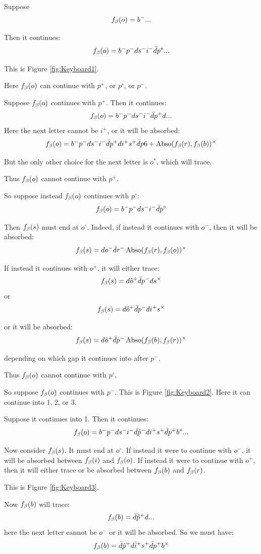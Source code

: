 \label{Keyboard}
Suppose
\[
f_\beta(o) = b^-...
\]

Then it continues:
\[
f_\beta(o) = b^- p^- d s^- i^- \bar{d} p^*...
\]

This is Figure \ref{fig:Keyboard1}.

Here $f_\beta(o)$ can continue with $p^+$, or $p^\circ$, or $p^-$.

Suppose $f_\beta(o)$ continues with $p^+$. Then it continues:
\[
f_\beta(o) = b^- p^- d s^- i^- \bar{d} p^+ d...
\]
Here the next letter cannot be $i^+$, or it will be absorbed:
\[
f_\beta(o) = b^- p^- d s^- i^- \bar{d} p^+ d i^+ s^+ \bar{d} p6+ \operatorname{Abso}(f_\beta(r), f_\beta(b))^\times
\]

But the only other choice for the next letter is $o^*$, which will trace. 

Thus $f_\beta(o)$ cannot continue with $p^+$.


So suppose instead $f_\beta(o)$ continues with $p^\circ$:
\[
f_\beta(o) = b^- p^- d s^- i^- \bar{d} p^\circ
\]

Then $f_\beta(s)$ must end at $o^\circ$. Indeed, if instead it continues with $o^-$, then it will be absorbed:
\[
f_\beta(s) = d o^- \bar{d} r^- \operatorname{Abso}(f_\beta(r), f_\beta(o))^\times
\]

If instead it continues with $o^+$, it will either trace:
\[
f_\beta(s) = d \hat{o}^+ \bar{d} p^- d s^\times
\]
or
\[
f_\beta(s) = d \hat{o}^+ \bar{d} p^- d i^+ s^\times
\]

or it will be absorbed:
\[
f_\beta(s) = d \hat{o}^+ \bar{d} p^- \operatorname{Abso}(f_\beta(b), f_\beta(r))^\times
\]

depending on which gap it continues into after $p^-$.

Thus $f_\beta(o)$ cannot continue with $p^\circ$.

So suppose $f_\beta(o)$ continues with $p^-$. This is Figure \ref{fig:Keyboard2}. Here it can continue into 1, 2, or 3. 

Suppose it continues into 1. Then it continues:
\[
f_\beta(o) = b^- p^- d s^- i^- \bar{d} \hat{p}^- d i^+ s^+ \bar{d} p^+ b^*... 
\]

Now consider $f_\beta(s)$. It must end at $o^\circ$. If instead it were to continue with $o^-$, it will be absorbed between $f_\beta(i)$ and $f_\beta(o)$. If instead it were to continue with $o^+$, then it will either trace or be absorbed between $f_\beta(b)$ and $f_\beta(r)$. 

This is Figure \ref{fig:Keyboard3}.

Now $f_\beta(b)$ will trace:
\[
f_\beta(b) = \bar{d} \hat{p}^+ d...
\]
here the next letter cannot be $o^-$ or it will be absorbed. So we must have:
\[
f_\beta(b) = \bar{d} \hat{p}^+ d \hat{i}^+ s^+ \bar{d} p^+ b^\times
\]

